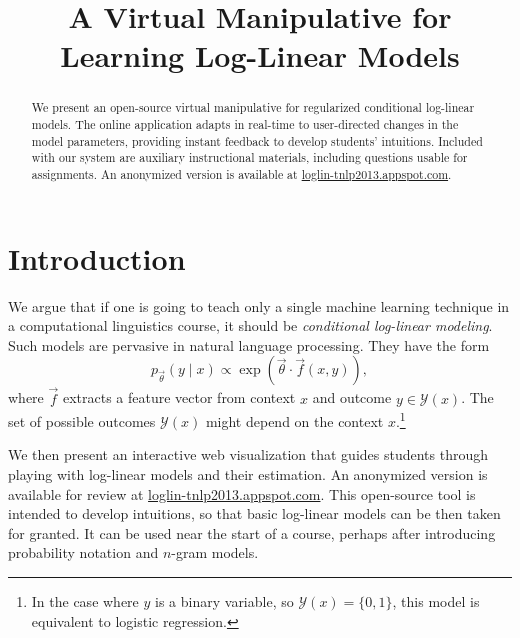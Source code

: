 \documentclass[11pt,letterpaper]{article}
\title{A Virtual Manipulative for Learning Log-Linear Models}
\author{
 }
\date{}
\newcommand{\WhereToFind}[0]{\url{loglin-tnlp2013.appspot.com}}
\begin{document}
\maketitle

\begin{abstract}
We present an open-source virtual manipulative for regularized conditional 
log-linear models. The online application adapts in real-time to user-directed 
changes in the model parameters, providing instant feedback to develop 
students' intuitions. Included with our system are auxiliary instructional materials, 
including questions usable for assignments. An anonymized version is available at
\WhereToFind{}.
\end{abstract}

\section{Introduction}\label{sec:intro}

We argue that if one is going to teach only a single machine learning
technique in a computational linguistics course, it should be {\em
  conditional log-linear modeling}.  Such models are pervasive in
natural language processing.  They have the form
\begin{equation}\label{eqn:loglin}
p_{\vec{\theta}}(y \mid x) \propto \exp{\left(\vec{\theta} \cdot \vec{f}\left(x,y\right)\right)},
\end{equation}
where $\vec{f}$ extracts a feature vector from context $x$ and
outcome $y \in \mathcal{Y}(x)$.  The set of possible
outcomes $\mathcal{Y}(x)$ might depend on the context $x$.\footnote{In the
  case where $y$ is a binary variable, so $\mathcal{Y}(x)=\{0,1\}$,
  this model is equivalent to logistic regression.}


We then present an interactive web visualization that guides students
through playing with log-linear models and their estimation. An
anonymized version is available for review at \WhereToFind{}.  This
open-source tool is intended to develop intuitions, so that basic
log-linear models can be then taken for granted.  It can be used near
the start of a course, perhaps after introducing probability notation
and $n$-gram models. 
\end{document}
